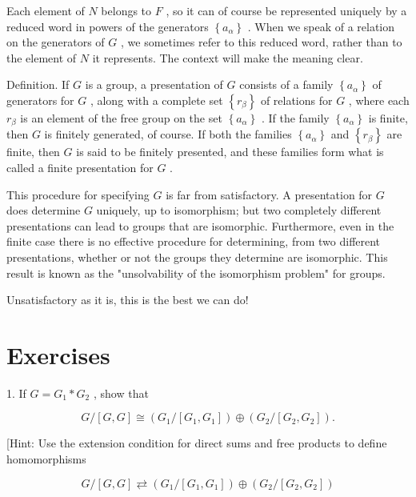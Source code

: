 Each element of \(N\) belongs to \(F\) , so it can of course be represented uniquely by a reduced word in powers of the generators \(\left\{  {a}_{\alpha }\right\}\) . When we speak of a relation on the generators of \(G\) , we sometimes refer to this reduced word, rather than to the element of \(N\) it represents. The context will make the meaning clear.

Definition. If \(G\) is a group, a presentation of \(G\) consists of a family \(\left\{  {a}_{\alpha }\right\}\) of generators for \(G\) , along with a complete set \(\left\{  {r}_{\beta }\right\}\) of relations for \(G\) , where each \({r}_{\beta }\) is an element of the free group on the set \(\left\{  {a}_{\alpha }\right\}\) . If the family \(\left\{  {a}_{\alpha }\right\}\) is finite, then \(G\) is finitely generated, of course. If both the families \(\left\{  {a}_{\alpha }\right\}\) and \(\left\{  {r}_{\beta }\right\}\) are finite, then \(G\) is said to be finitely presented, and these families form what is called a finite presentation for \(G\) .

This procedure for specifying \(G\) is far from satisfactory. A presentation for \(G\) does determine \(G\) uniquely, up to isomorphism; but two completely different presentations can lead to groups that are isomorphic. Furthermore, even in the finite case there is no effective procedure for determining, from two different presentations, whether or not the groups they determine are isomorphic. This result is known as the "unsolvability of the isomorphism problem" for groups.

Unsatisfactory as it is, this is the best we can do!

\section*{Exercises}

1. If \(G = {G}_{1} * {G}_{2}\) , show that

\[
G/\left\lbrack  {G,G}\right\rbrack   \cong  \left( {{G}_{1}/\left\lbrack  {{G}_{1},{G}_{1}}\right\rbrack  }\right)  \oplus  \left( {{G}_{2}/\left\lbrack  {{G}_{2},{G}_{2}}\right\rbrack  }\right) .
\]

[Hint: Use the extension condition for direct sums and free products to define homomorphisms

\[
G/\left\lbrack  {G,G}\right\rbrack   \rightleftarrows  \left( {{G}_{1}/\left\lbrack  {{G}_{1},{G}_{1}}\right\rbrack  }\right)  \oplus  \left( {{G}_{2}/\left\lbrack  {{G}_{2},{G}_{2}}\right\rbrack  }\right)
\]

